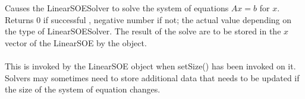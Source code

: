  \\
 \\
Causes the LinearSOESolver to solve the system of equations $Ax=b$ for $x$.
Returns $0$ if successful , negative number if not; the actual value depending on
the type of LinearSOESolver. The result of the solve are to be stored
in the $x$ vector of the LinearSOE by the object.\\

 \\
This is invoked by the \p LinearSOE object when setSize() has
been invoked on it. Solvers may sometimes need to store additional
data that needs to be updated if the size of the system of equation
changes. \\




